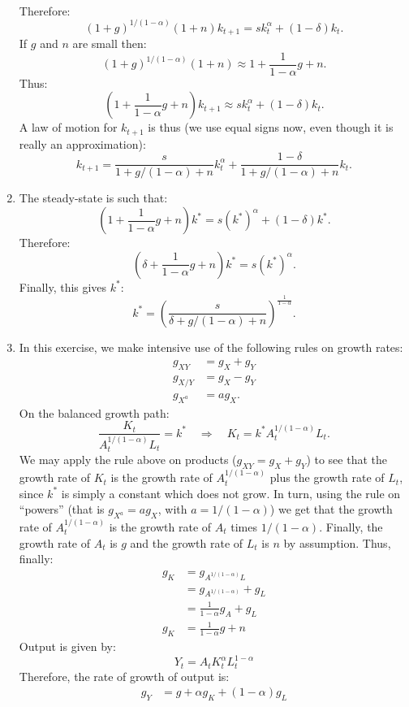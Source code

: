 \documentclass[]{book}
\begin{document}
\begin{enumerate}
\[\begin{aligned}
  \end{aligned}
  \] Therefore:
  \[(1+g)^{1/(1-\alpha)}(1+n) k_{t+1} =sk_t^\alpha+(1-\delta)k_t.\] If
  \(g\) and \(n\) are small then:
  \[(1+g)^{1/(1-\alpha)}(1+n)\approx1+\frac{1}{1-\alpha}g+n.\] Thus:
  \[\left(1+\frac{1}{1-\alpha}g+n\right)k_{t+1}\approx s k_t^\alpha+(1-\delta)k_t.\]
  A law of motion for \(k_{t+1}\) is thus (we use equal signs now, even
  though it is really an approximation):
  \[\boxed{k_{t+1}=\frac{s}{1+g/(1-\alpha)+n}k_t^{\alpha}+\frac{1-\delta}{1+g/(1-\alpha)+n}k_t}.\]
\item
  The steady-state is such that:
  \[\left(1+\frac{1}{1-\alpha}g+n\right)k^{*} = s(k^{*})^\alpha + (1-\delta)k^{*}.\]
  Therefore:
  \[\left(\delta+\frac{1}{1-\alpha}g+n\right)k^{*} = s(k^{*})^\alpha.\]
  Finally, this gives \(k^{*}\):
  \[\boxed{k^{*}=\left(\frac{s}{\delta+g/(1-\alpha)+n}\right)^{\frac{1}{1-\alpha}}}.\]
\item
  In this exercise, we make intensive use of the following rules on
  growth rates: \[
  \begin{aligned}
  g_{XY}&=g_X+g_Y\\
  g_{X/Y}&=g_X-g_Y\\
  g_{X^a}&=ag_X.
  \end{aligned}
  \] On the balanced growth path:
  \[\frac{K_t}{A_t^{1/(1-\alpha)} L_t}=k^{*} \quad \Rightarrow \quad K_t = k^{*}A_t^{1/(1-\alpha)} L_t.\]
  We may apply the rule above on products (\(g_{XY}=g_X+g_Y\)) to see
  that the growth rate of \(K_t\) is the growth rate of
  \(A_t^{1/(1-\alpha)}\) plus the growth rate of \(L_t\), since
  \(k^{*}\) is simply a constant which does not grow. In turn, using the
  rule on ``powers'' (that is \(g_{X^a}=ag_X\), with \(a=1/(1-\alpha)\))
  we get that the growth rate of \(A_t^{1/(1-\alpha)}\) is the growth
  rate of \(A_t\) times \(1/(1-\alpha)\). Finally, the growth rate of
  \(A_t\) is \(g\) and the growth rate of \(L_t\) is \(n\) by
  assumption. Thus, finally: \[
  \begin{aligned}
  g_K &=g_{A^{1/(1-\alpha)}L}\\
  &=g_{A^{1/(1-\alpha)}} + g_L\\
  &=\frac{1}{1-\alpha}g_A + g_L\\
  g_K &=\frac{1}{1-\alpha}g + n
  \end{aligned}
  \] Output is given by: \[Y_t=A_t K_t^{\alpha} L_t^{1-\alpha}\]
  Therefore, the rate of growth of output is: \[
  \begin{aligned}
  g_Y &= g + \alpha g_K +(1-\alpha)g_L\\

\end{aligned}\]
\end{enumerate}
\end{document}
